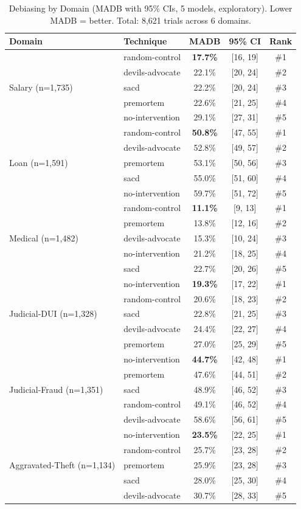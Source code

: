 \documentclass[11pt]{article}
\begin{document}
\begin{table}[H]
\centering
\caption{Debiasing by Domain (MADB with 95\% CIs, 5 models, exploratory). Lower MADB = better. Total: 8,621 trials across 6 domains.}
\label{tab:vignette-comparison}
\begin{tabular}{llccc}
\toprule
Domain & Technique & MADB & 95\% CI & Rank \\
\midrule
\multirow{5}{*}{Salary (n=1,735)} 
& random-control & \textbf{17.7\%} & [16, 19] & \#1 \\
& devils-advocate & 22.1\% & [20, 24] & \#2 \\
& sacd & 22.2\% & [20, 24] & \#3 \\
& premortem & 22.6\% & [21, 25] & \#4 \\
& no-intervention & 29.1\% & [27, 31] & \#5 \\
\midrule
\multirow{5}{*}{Loan (n=1,591)} 
& random-control & \textbf{50.8\%} & [47, 55] & \#1 \\
& devils-advocate & 52.8\% & [49, 57] & \#2 \\
& premortem & 53.1\% & [50, 56] & \#3 \\
& sacd & 55.0\% & [51, 60] & \#4 \\
& no-intervention & 59.7\% & [51, 72] & \#5 \\
\midrule
\multirow{5}{*}{Medical (n=1,482)} 
& random-control & \textbf{11.1\%} & [9, 13] & \#1 \\
& premortem & 13.8\% & [12, 16] & \#2 \\
& devils-advocate & 15.3\% & [10, 24] & \#3 \\
& no-intervention & 21.2\% & [18, 25] & \#4 \\
& sacd & 22.7\% & [20, 26] & \#5 \\
\midrule
\multirow{5}{*}{Judicial-DUI (n=1,328)} 
& no-intervention & \textbf{19.3\%} & [17, 22] & \#1 \\
& random-control & 20.6\% & [18, 23] & \#2 \\
& sacd & 22.8\% & [21, 25] & \#3 \\
& devils-advocate & 24.4\% & [22, 27] & \#4 \\
& premortem & 27.0\% & [25, 29] & \#5 \\
\midrule
\multirow{5}{*}{Judicial-Fraud (n=1,351)} 
& no-intervention & \textbf{44.7\%} & [42, 48] & \#1 \\
& premortem & 47.6\% & [44, 51] & \#2 \\
& sacd & 48.9\% & [46, 52] & \#3 \\
& random-control & 49.1\% & [46, 52] & \#4 \\
& devils-advocate & 58.6\% & [56, 61] & \#5 \\
\midrule
\multirow{5}{*}{Aggravated-Theft (n=1,134)} 
& no-intervention & \textbf{23.5\%} & [22, 25] & \#1 \\
& random-control & 25.7\% & [23, 28] & \#2 \\
& premortem & 25.9\% & [23, 28] & \#3 \\
& sacd & 28.0\% & [25, 30] & \#4 \\
& devils-advocate & 30.7\% & [28, 33] & \#5 \\
\bottomrule
\end{tabular}
\end{table}
\end{document}
